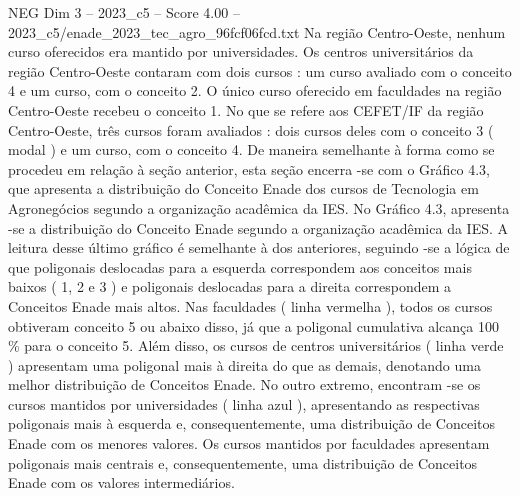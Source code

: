 \begin{textsample}{NEG Dim 3 – 2023\_c5 – Score 4.00 – 2023\_c5/enade\_2023\_tec\_agro\_96fcf06fcd.txt}
Na região Centro-Oeste, nenhum curso oferecidos era mantido por universidades.
Os centros universitários da região Centro-Oeste contaram com dois cursos : um curso avaliado com o conceito 4 e um curso, com o conceito 2.
O único curso oferecido em faculdades na região Centro-Oeste recebeu o conceito 1.
No que se refere aos CEFET/IF da região Centro-Oeste, três cursos foram avaliados : dois cursos deles com o conceito 3 ( modal ) e um curso, com o conceito 4.
De maneira semelhante à forma como se procedeu em relação à seção anterior, esta seção encerra -se com o Gráfico 4.3, que apresenta a distribuição do Conceito Enade dos cursos de Tecnologia em Agronegócios segundo a organização acadêmica da IES.
No Gráfico 4.3, apresenta -se a distribuição do Conceito Enade segundo a organização acadêmica da IES.
A leitura desse último gráfico é semelhante à dos anteriores, seguindo -se a lógica de que poligonais deslocadas para a esquerda correspondem aos conceitos mais baixos ( 1, 2 e 3 ) e poligonais deslocadas para a direita correspondem a Conceitos Enade mais altos.
Nas faculdades ( linha vermelha ), todos os cursos obtiveram conceito 5 ou abaixo disso, já que a poligonal cumulativa alcança 100 \% para o conceito 5.
Além disso, os cursos de centros universitários ( linha verde ) apresentam uma poligonal mais à direita do que as demais, denotando uma melhor distribuição de Conceitos Enade.
No outro extremo, encontram -se os cursos mantidos por universidades ( linha azul ), apresentando as respectivas poligonais mais à esquerda e, consequentemente, uma distribuição de Conceitos Enade com os menores valores.
Os cursos mantidos por faculdades apresentam poligonais mais centrais e, consequentemente, uma distribuição de Conceitos Enade com os valores intermediários.

\end{textsample}
